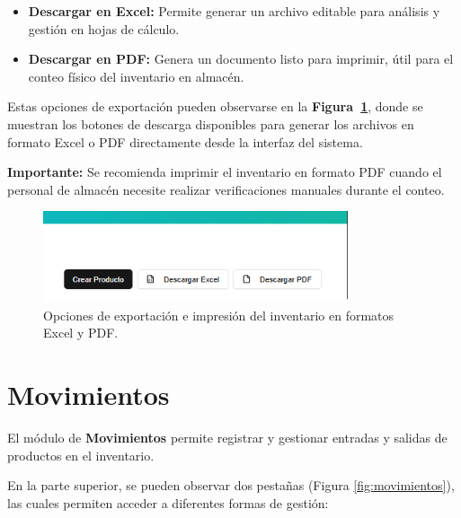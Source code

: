 \begin{itemize}
  \item \textbf{Descargar en Excel:} Permite generar un archivo editable para análisis y gestión en hojas de cálculo.
  \item \textbf{Descargar en PDF:} Genera un documento listo para imprimir, útil para el conteo físico del inventario en almacén.
\end{itemize}


\begin{justify}
Estas opciones de exportación pueden observarse en la \textbf{Figura~\ref{fig:exportarInventario}}, donde se muestran los botones de descarga disponibles para generar los archivos en formato Excel o PDF directamente desde la interfaz del sistema.
\end{justify}

\begin{justify}
\textbf{Importante:} Se recomienda imprimir el inventario en formato PDF cuando el personal de almacén necesite realizar verificaciones manuales durante el conteo.
\end{justify}

\begin{figure}[H]
\centering
\includegraphics[width=0.8\textwidth]{imgs/Almacen_General/inventario/inventario_pdf_excel_down.png}
\caption{Opciones de exportación e impresión del inventario en formatos Excel y PDF.}
\label{fig:exportarInventario}
\end{figure}




\section{Movimientos}
\begin{justify}
    
El módulo de \textbf{Movimientos} permite registrar y gestionar entradas y salidas de productos en el inventario. 

En la parte superior, se pueden observar dos pestañas (Figura \ref{fig:movimientos}), las cuales permiten acceder a diferentes formas de gestión:
\end{justify}


